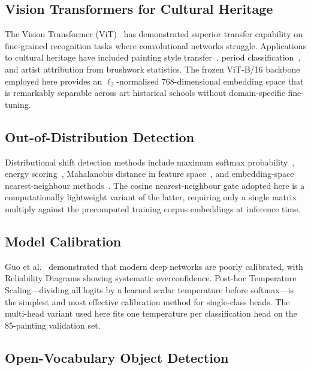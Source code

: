 \documentclass[12pt, a4paper, twoside]{article}
\begin{document}
\subsection{Vision Transformers for Cultural Heritage}

The Vision Transformer (ViT)~\cite{dosovitskiy2021image} has demonstrated superior transfer capability on fine-grained recognition tasks where convolutional networks struggle. Applications to cultural heritage have included painting style transfer~\cite{gatys2016neural}, period classification~\cite{tan2016ceci}, and artist attribution from brushwork statistics. The frozen ViT-B/16 backbone employed here provides an ${\ell_2}$-normalised 768-dimensional embedding space that is remarkably separable across art historical schools without domain-specific fine-tuning.

\subsection{Out-of-Distribution Detection}

Distributional shift detection methods include maximum softmax probability~\cite{hendrycks2017baseline}, energy scoring~\cite{liu2020energy}, Mahalanobis distance in feature space~\cite{lee2018mahalanobis}, and embedding-space nearest-neighbour methods~\cite{sun2022knn}. The cosine nearest-neighbour gate adopted here is a computationally lightweight variant of the latter, requiring only a single matrix multiply against the precomputed training corpus embeddings at inference time.

\subsection{Model Calibration}

Guo et al.~\cite{guo2017calibration} demonstrated that modern deep networks are poorly calibrated, with Reliability Diagrams showing systematic overconfidence. Post-hoc Temperature Scaling—dividing all logits by a learned scalar temperature before softmax—is the simplest and most effective calibration method for single-class heads. The multi-head variant used here fits one temperature per classification head on the 85-painting validation set.

\subsection{Open-Vocabulary Object Detection}
\end{document}
